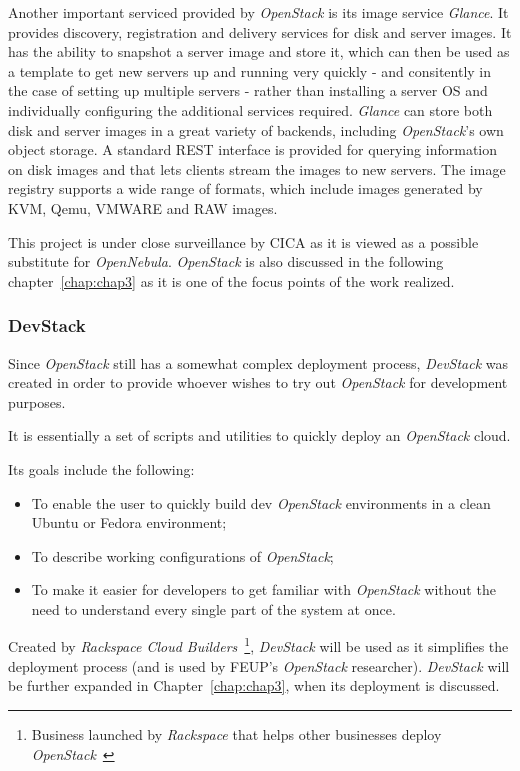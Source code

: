 Another important serviced provided by \textit{OpenStack} is its image service \textit{Glance}. It provides discovery, registration and delivery services for disk and server images. It has the ability to snapshot a server image and store it, which can then be used as a template to get new servers up and running very quickly - and consitently in the case of setting up multiple servers - rather than installing a server OS and individually configuring the additional services required. \textit{Glance} can store both disk and server images in a great variety of backends, including \textit{OpenStack}'s own object storage. A standard REST interface is provided for querying information on disk images and that lets clients stream the images to new servers. The image registry supports a wide range of formats, which include images generated by KVM, Qemu, VMWARE and RAW images.

This project is under close surveillance by CICA as it is viewed as a possible substitute for \textit{OpenNebula}. \textit{OpenStack} is also discussed in the following chapter~\ref{chap:chap3} as it is one of the focus points of the work realized.

\subsubsection{DevStack}\label{subsubsec:devstack}

Since \textit{OpenStack} still has a somewhat complex deployment process, \textit{DevStack} was created in order to provide whoever wishes to try out \textit{OpenStack} for development purposes.

It is essentially a set of scripts and utilities to quickly deploy an \textit{OpenStack} cloud.
 
Its goals include the following:
\begin{itemize}
\item To enable the user to quickly build dev \textit{OpenStack} environments in a clean Ubuntu or Fedora environment;
\item To describe working configurations of \textit{OpenStack}; 
\item To make it easier for developers to get familiar with \textit{OpenStack} without the need to understand every single part of the system at once.
\end{itemize}


Created by \textit{Rackspace Cloud Builders}~\footnote{Business launched by \textit{Rackspace} that helps other businesses deploy \textit{OpenStack}~\cite{cloudbuilders}}, \textit{DevStack} will be used as it simplifies the deployment process (and is used by FEUP's \textit{OpenStack} researcher). \textit{DevStack} will be further expanded in Chapter~\ref{chap:chap3}, when its deployment is discussed.

